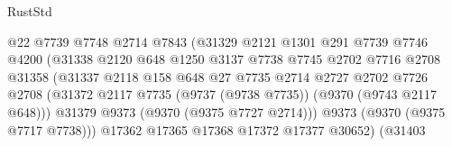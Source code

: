 \begin{lexlean}{RustStd}
\begin{coremodule}
                                        @22
                                        @7739
                                        @7748
                                        @2714
                                        @7843
                                        (@31329
                                          @2121
                                          @1301
                                          @291
                                          @7739
                                          @7746
                                          @4200
                                          (@31338
                                            @2120
                                            @648
                                            @1250
                                            @3137
                                            @7738
                                            @7745
                                            @2702
                                            @7716
                                            @2708
                                            @31358
                                            (@31337
                                              @2118
                                              @158
                                              @648
                                              @27
                                              @7735
                                              @2714
                                              @2727
                                              @2702
                                              @7726
                                              @2708
                                              (@31372
                                                @2117
                                                @7735
                                                (@9737 (@9738 @7735))
                                                (@9370 (@9743 @2117 @648)))
                                              @31379
                                              @9373
                                              (@9370 (@9375 @7727 @2714)))
                                            @9373
                                            (@9370 (@9375 @7717 @7738)))
                                          @17362
                                          @17365
                                          @17368
                                          @17372
                                          @17377
                                          @30652)
                                        (@31403

\end{coremodule}
\end{lexlean}
